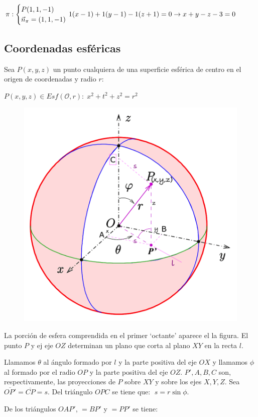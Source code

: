 \noindent $\pi: \begin{cases} P(1,1,-1) \\ \vec n_{\pi}=(1,1,-1) \end{cases} \hspace{-3mm} 1(x-1)+1(y-1)-1(z+1)=0\to x+y-z-3=0$


\subsection{Coordenadas esféricas}

Sea $P(x,y,z)$ un punto cualquiera de una superficie esférica de centro en el origen de coordenadas y radio $r$:

$P(x,y,z) \in Esf(\mathcal O, r):\; x^2+t^2+z^2=r^2$

	\begin{figure}[H]
		\centering
		\includegraphics[width=.75\textwidth]{imagenes/imagenes12/T12IM04.png}
	\end{figure}


La porción de esfera comprendida en el primer `octante' aparece el la figura. El punto $P$ y ej eje $OZ$ determinan un plano que corta al plano $XY$ en la recta $l$. 

Llamamos $\theta$ al ángulo formado por $l$ y la parte positiva del eje $OX$ y llamamos $\phi$ al formado por el radio $OP$ y la parte positiva del eje $OZ$. $P',A,B,C$ son, respectivamente, las proyecciones de $P$ sobre $XY$ y sobre los ejes $X,Y,Z$. Sea $\overline{OP'}=\overline{CP}=s$. Del triángulo $OPC$ se tiene que: $\; s=r\sin \phi$.


De los triángulos $OAP'$, $=BP'$ y $=PP'$ se tiene:

